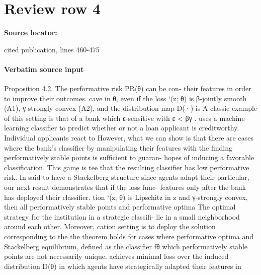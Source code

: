 \documentclass[10pt]{article}
\begin{document}
\section*{Review row 4}
\textbf{Source locator:} {\footnotesize\raggedright cited publication, lines 460-\allowbreak{}475\par}
\paragraph{Verbatim source input}
\begin{ReviewVerbatim}
Proposition 4.2. The performative risk PR(θ) can be con-
                                                                      their features in order to improve their outcomes.
cave in θ, even if the loss `(z; θ) is β-jointly smooth (A1),
γ-strongly convex (A2), and the distribution map D(·) is              A classic example of this setting is that of a bank which
ε-sensitive with ε < βγ .                                             uses a machine learning classiﬁer to predict whether or not a
                                                                      loan applicant is creditworthy. Individual applicants react to
However, what we can show is that there are cases where               the bank’s classiﬁer by manipulating their features with the
ﬁnding performatively stable points is sufﬁcient to guaran-           hopes of inducing a favorable classiﬁcation. This game is
tee that the resulting classiﬁer has low performative risk. In        said to have a Stackelberg structure since agents adapt their
particular, our next result demonstrates that if the loss func-       features only after the bank has deployed their classiﬁer.
tion `(z; θ) is Lipschitz in z and γ-strongly convex, then
all performatively stable points and performative optima              The optimal strategy for the institution in a strategic classiﬁ-
lie in a small neighborhood around each other. Moreover,              cation setting is to deploy the solution corresponding to the
the theorem holds for cases where performative optima and             Stackelberg equilibrium, deﬁned as the classiﬁer fθ which
performatively stable points are not necessarily unique.              achieves minimal loss over the induced distribution D(θ)
                                                                      in which agents have strategically adapted their features in
\end{ReviewVerbatim}
\end{document}
